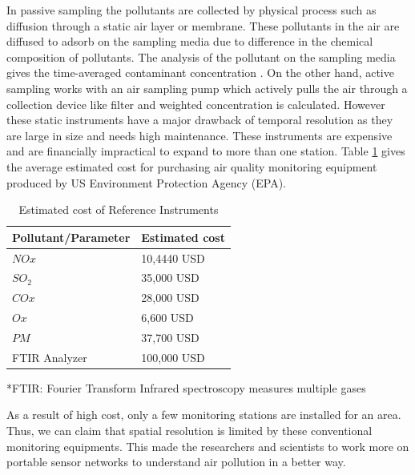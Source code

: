 \par

In passive sampling the pollutants are collected by physical process such as diffusion through a static air layer or membrane. These pollutants in the air are diffused to adsorb on the sampling media due to difference in the chemical composition of pollutants. The analysis of the pollutant on the sampling media gives the time-averaged contaminant concentration \cite{Environment2009}. On the other hand, active sampling works with an air sampling pump which actively pulls the air through a collection device like filter  and weighted concentration is calculated. However these static instruments have a major drawback of temporal resolution as they are large in size and needs high maintenance. These instruments are expensive and are financially impractical to expand to more than one station. Table \ref{table:cost} gives the average estimated cost for purchasing air quality monitoring equipment produced by US Environment Protection Agency (EPA). 

\begin{table}[h]
  
  
    \begin{tabularx}{\columnwidth}{X|X}
        \hline
        Pollutant/Parameter           & Estimated cost    \\
        \hline
    
      $NOx$   & 10,4440         USD \\ 
      $SO_2$   & 35,000          USD \\ 
      $COx$   & 28,000          USD\\ 
      $Ox$   & 6,600            USD\\ 
      $PM$   & 37,700           USD\\ 
     
      FTIR Analyzer   & 100,000 USD\\ \hline
     
        
      
  \end{tabularx}
  *FTIR: Fourier Transform Infrared spectroscopy measures multiple gases 
    \caption{Estimated cost of Reference Instruments\cite{Mussatti2000}}
    \label{table:cost}
  \end{table}


As a result of high cost, only a few monitoring stations are installed for an area. Thus, we can claim that spatial resolution is limited by these conventional monitoring equipments. This made the researchers and scientists to work more on portable sensor networks to understand air pollution in a better way.


